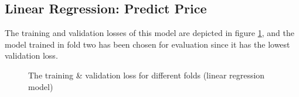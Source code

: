 \documentclass[12pt,twoside]{report}
\begin{document}
\subsection{Linear Regression: Predict Price}
The training and validation losses of this model are depicted in figure \ref{linear_regression_fold_5}, and the model trained in fold two has been chosen for evaluation since it has the lowest validation loss. 
\\
\begin{figure}[!htbp]
	\centering
	\hfill
	\hfill
	\hfil
	\hfil
	\caption{The training \& validation loss for different folds (linear regression model)}
	\label{linear_regression_fold_5}
\end{figure}
\end{document}
